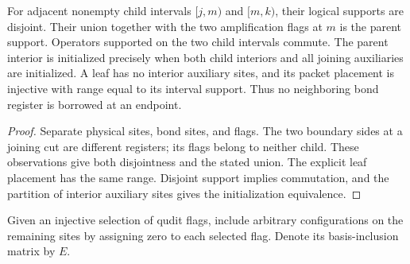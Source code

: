 \begin{lemma}
    \label{thm:mpu_interval_register_support}
    \leanok
    For adjacent nonempty child intervals $\lbrack j,m)$ and $\lbrack m,k)$,
    their logical supports are disjoint. Their union together with
    the two amplification flags at $m$ is the parent support.
    Operators supported on the two child intervals commute.
    The parent interior is initialized precisely when both child
    interiors and all joining auxiliaries are initialized.
    A leaf has no interior auxiliary sites, and its packet placement
    is injective with range equal to its interval support. Thus no
    neighboring bond register is borrowed at an endpoint.
\end{lemma}
\begin{proof}\leanok
    Separate physical sites, bond sites, and flags. The two boundary
    sides at a joining cut are different registers; its flags belong
    to neither child. These observations give both disjointness and
    the stated union. The explicit leaf placement has the same range.
    Disjoint support implies commutation, and the partition of
    interior auxiliary sites gives the initialization equivalence.
\end{proof}

\begin{definition}
    \label{def:mpu_initialized_flag_inclusion}
    \leanok
    Given an injective selection of qudit flags, include arbitrary
    configurations on the remaining sites by assigning zero to each
    selected flag. Denote its basis-inclusion matrix by $E$.
\end{definition}

